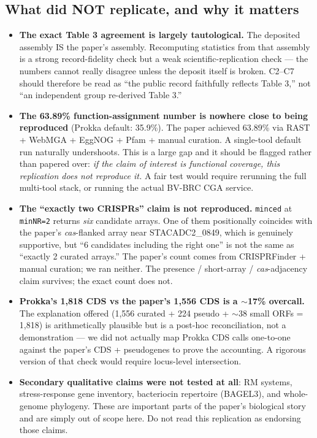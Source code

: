 \documentclass[11pt]{article}
\begin{document}
\subsection{What did NOT replicate, and why it matters}
\begin{itemize}[leftmargin=*, itemsep=2pt]
  \item \textbf{The exact Table 3 agreement is largely tautological.} The deposited assembly IS
  the paper's assembly. Recomputing statistics from that assembly is a strong record-fidelity
  check but a weak scientific-replication check --- the numbers cannot really disagree unless
  the deposit itself is broken. C2--C7 should therefore be read as ``the public record faithfully
  reflects Table 3,'' not ``an independent group re-derived Table 3.''
  \item \textbf{The 63.89\% function-assignment number is nowhere close to being reproduced}
  (Prokka default: 35.9\%). The paper achieved 63.89\% via RAST + WebMGA + EggNOG + Pfam + manual
  curation. A single-tool default run naturally undershoots. This is a large gap and it should be
  flagged rather than papered over: \emph{if the claim of interest is functional coverage, this
  replication does not reproduce it.} A fair test would require rerunning the full multi-tool
  stack, or running the actual BV-BRC CGA service.
  \item \textbf{The ``exactly two CRISPRs'' claim is not reproduced.} \texttt{minced} at
  \texttt{minNR=2} returns \emph{six} candidate arrays. One of them positionally coincides with
  the paper's \emph{cas}-flanked array near STACADC2\_0849, which is genuinely supportive, but
  ``6 candidates including the right one'' is not the same as ``exactly 2 curated arrays.''
  The paper's count comes from CRISPRFinder + manual curation; we ran neither. The presence /
  short-array / \emph{cas}-adjacency claim survives; the exact count does not.
  \item \textbf{Prokka's 1{,}818 CDS vs the paper's 1{,}556 CDS is a $\sim$17\% overcall.} The
  explanation offered (1{,}556 curated + 224 pseudo + $\sim$38 small ORFs = 1{,}818) is arithmetically
  plausible but is a post-hoc reconciliation, not a demonstration --- we did not actually map
  Prokka CDS calls one-to-one against the paper's CDS + pseudogenes to prove the accounting.
  A rigorous version of that check would require locus-level intersection.
  \item \textbf{Secondary qualitative claims were not tested at all}: RM systems, stress-response
  gene inventory, bacteriocin repertoire (BAGEL3), and whole-genome phylogeny. These are important
  parts of the paper's biological story and are simply out of scope here. Do not read this
  replication as endorsing those claims.
\end{itemize}
\end{document}
